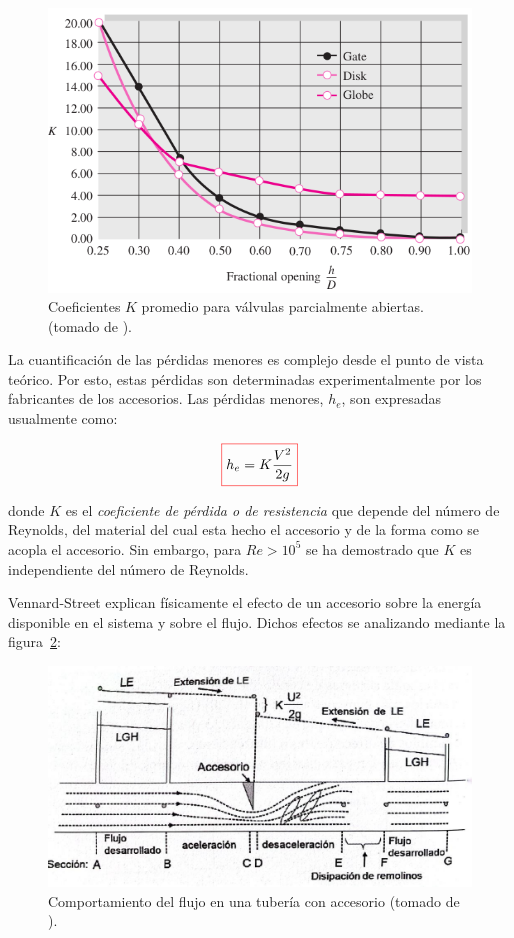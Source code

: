 \documentclass[11pt, oneside]{article}
\begin{document}
\begin{figure}[h]
\centering
\includegraphics[width=12cm]{acce02.png}
\caption{Coeficientes $K$ promedio para v\'alvulas parcialmente abiertas. (tomado de \cite{white1990fluid}).}
\label{acce02}
\end{figure}









La cuantificaci\'on de las p\'erdidas menores es complejo desde el punto de vista te\'orico. Por esto, estas p\'erdidas son determinadas experimentalmente por los fabricantes de los accesorios. Las p\'erdidas menores, $h_e$, son expresadas usualmente como:

\begin{equation}
\color{red}\boxed{\color{black} h_e = K \frac{V^2}{2g} }
\label{perm0}
\end{equation}

donde $K$ es el \emph{coeficiente de p\'erdida o de resistencia} que depende del n\'umero de Reynolds, del material del cual esta hecho el accesorio y de la forma como se acopla el accesorio. Sin embargo, para $Re > 10^5$ se ha demostrado que $K$ es independiente del n\'umero de Reynolds.

Vennard-Street explican  f\'isicamente el efecto de un accesorio sobre la energ\'ia disponible en el sistema y sobre el flujo. Dichos efectos se analizando mediante la figura~\ref{acce1}:

\begin{figure}[h]
\centering
\includegraphics[width=12cm]{acce1.jpeg}
\caption{Comportamiento del flujo en una tuber\'ia con accesorio (tomado de \cite{agudelo2011mecanica}).}
\label{acce1}
\end{figure}
\end{document}
